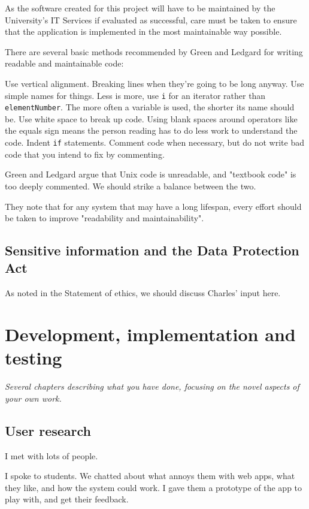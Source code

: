 \documentclass[]{scrartcl}
\begin{document}
As the software created for this project will have to be maintained by the University's IT Services if evaluated as successful, care must be taken to ensure that the application is implemented in the most maintainable way possible.

There are several basic methods recommended by Green and Ledgard \cite{Green:2011:CGF:2063166.2063168} for writing readable and maintainable code:

Use vertical alignment. Breaking lines when they're going to be long anyway. Use simple names for things. Less is more, use \texttt{i} for an iterator rather than \texttt{elementNumber}. The more often a variable is used, the shorter its name should be. Use white space to break up code. Using blank spaces around operators like the equals sign means the person reading has to do less work to understand the code. Indent \texttt{if} statements. Comment code when necessary, but do not write bad code that you intend to fix by commenting.

Green and Ledgard argue that Unix code is unreadable, and "textbook code" is too deeply commented. We should strike a balance between the two.

They note that for any system that may have a long lifespan, every effort should be taken to improve "readability and maintainability".

\subsection{Sensitive information and the Data Protection Act}

As noted in the Statement of ethics, we should discuss Charles' input here.

\section{Development, implementation and testing}

\textit{Several chapters describing what you have done, focusing on the novel aspects of your own work.}

\subsection{User research}

I met with lots of people.

I spoke to students. We chatted about what annoys them with web apps, what they like, and how the system could work. I gave them a prototype of the app to play with, and get their feedback.
\end{document}
